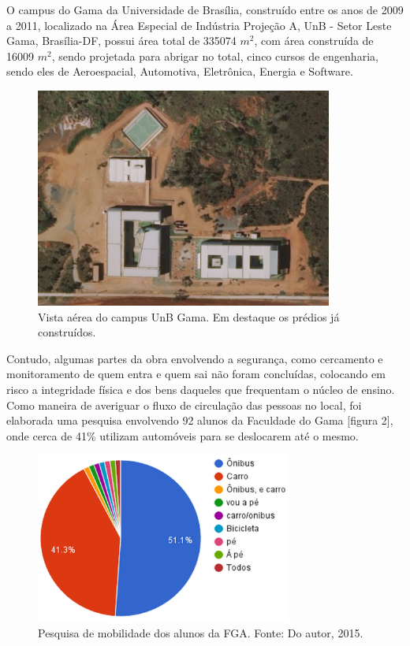 O campus do Gama da Universidade de Brasília, construído entre os anos de 2009 a 2011, localizado na Área Especial de Indústria Projeção A, UnB - Setor Leste Gama, Brasília-DF, possui área total de 335074 $m^2$, com área construída de 16009 $m^2$, sendo projetada para abrigar no total, cinco cursos de engenharia, sendo eles de Aeroespacial, Automotiva, Eletrônica, Energia e Software.

\begin{figure}[H]
  \centering
  \includegraphics[width=0.87\textwidth]{figuras/fga1}
  \caption{Vista aérea do campus UnB Gama. Em destaque os prédios já construídos.}
  \label{img:fga1}
\end{figure}

Contudo, algumas partes da obra envolvendo a segurança, como cercamento e monitoramento de quem entra e quem sai não foram concluídas, colocando em risco a integridade física e dos bens daqueles que frequentam o núcleo de ensino. Como maneira de averiguar o fluxo de circulação das pessoas no local, foi elaborada uma pesquisa envolvendo  92 alunos da Faculdade do Gama [figura 2], onde cerca de 41\%  utilizam automóveis para se deslocarem até o mesmo.

\begin{figure}[H]
  \centering
  \includegraphics[width=0.75\textwidth]{figuras/pesquisa}
  \caption{Pesquisa de mobilidade dos alunos da FGA. Fonte: Do autor, 2015.}
  \label{img:pesquisa}
\end{figure}

